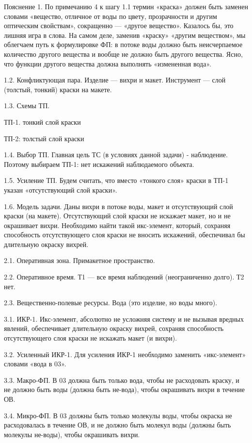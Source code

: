 Пояснение 1.  По примечанию 4 к  шагу 1.1 термин «краска»  должен быть
заменен словами «вещество,  отличное от воды по  цвету, прозрачности и
другим оптическим свойствам», сокращенно — «другое вещество». Казалось
бы, это лишняя  игра в слова. На самом деле,  заменив «краску» «другим
веществом», мы облегчаем путь к  формулировке ФП: в потоке воды должно
быть неисчерпаемое количество другого вещества и вообще не должно быть
другого вещества. Ясно, что  функции другого вещества должна выполнять
«измененная вода».

1.2. Конфликтующая  пара. Изделие —  вихри и макет. Инструмент  — слой
(толстый, тонкий) краски на макете.

1.3. Схемы ТП.

ТП-1. тонкий слой краски


ТП-2: толстый слой краски

1.4.  Выбор  ТП.  Главная  цель   ТС  (в  условиях  данной  задачи)  -
наблюдение. Поэтому выбираем ТП-1: нет искажений наблюдаемого объекта.

1.5. Усиление  ТП. Будем считать,  что вместо «тонкого слоя»  краски в
ТП-1 указан «отсутствующий слой краски».

1.6. Модель  задачи. Даны вихри  в потоке воды, макет  и отсутствующий
слой краски (на макете). Отсутствующий  слой краски не искажает макет,
но и не окрашивает вихри. Необходимо найти такой икс-элемент, который,
сохраняя способность отсутствующего слоя  краски не вносить искажений,
обеспечивал бы длительную окраску вихрей.

2.1. Оперативная зона. Примакетное пространство.

2.2.  Оперативное  время. Т1  —  все  время наблюдений  (неограниченно
долго). Т2 нет.

2.3. Вещественно-полевые ресурсы. Вода (это изделие, но воды много).

3.1. ИКР-1.  Икс-элемент, абсолютно не  усложняя систему и  не вызывая
вредных  явлений,  обеспечивает  длительную окраску  вихрей,  сохраняя
способность отсутствующего слоя краски не искажать макет (и вихри).

3.2.  Усиленный   ИКР-1.  Для   усиления  ИКР-1   необходимо  заменить
«икс-элемент» словами «вода в 03».

3.3.  Макро-ФП. В  03 должна  быть только  вода, чтобы  не расходовать
краску, и не должно быть  воды (должна быть не-вода), чтобы окрашивать
вихри в течение ОВ.

3.4. Микро-ФП. В 03 должны быть только молекулы воды, чтобы окраска не
расходовалась в течение ОВ, и не должно быть молекул воды (должны быть
молекулы не-воды), чтобы окрашивать вихри.

